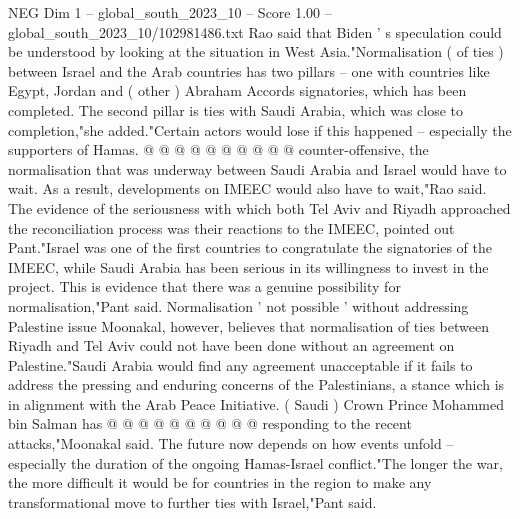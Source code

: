 \begin{textsample}{NEG Dim 1 – global\_south\_2023\_10 – Score 1.00 – global\_south\_2023\_10/102981486.txt}
Rao said that Biden ' s speculation could be understood by looking at the situation in West Asia."Normalisation ( of ties ) between Israel and the Arab countries has two pillars -- one with countries like Egypt, Jordan and ( other ) Abraham Accords signatories, which has been completed.
The second pillar is ties with Saudi Arabia, which was close to completion,"she added."Certain actors would lose if this happened -- especially the supporters of Hamas. @ @ @ @ @ @ @ @ @ @ counter-offensive, the normalisation that was underway between Saudi Arabia and Israel would have to wait.
As a result, developments on IMEEC would also have to wait,"Rao said.
The evidence of the seriousness with which both Tel Aviv and Riyadh approached the reconciliation process was their reactions to the IMEEC, pointed out Pant."Israel was one of the first countries to congratulate the signatories of the IMEEC, while Saudi Arabia has been serious in its willingness to invest in the project.
This is evidence that there was a genuine possibility for normalisation,"Pant said.
Normalisation ' not possible ' without addressing Palestine issue Moonakal, however, believes that normalisation of ties between Riyadh and Tel Aviv could not have been done without an agreement on Palestine."Saudi Arabia would find any agreement unacceptable if it fails to address the pressing and enduring concerns of the Palestinians, a stance which is in alignment with the Arab Peace Initiative. ( Saudi ) Crown Prince Mohammed bin Salman has @ @ @ @ @ @ @ @ @ @ responding to the recent attacks,"Moonakal said.
The future now depends on how events unfold -- especially the duration of the ongoing Hamas-Israel conflict."The longer the war, the more difficult it would be for countries in the region to make any transformational move to further ties with Israel,"Pant said.

\end{textsample}
